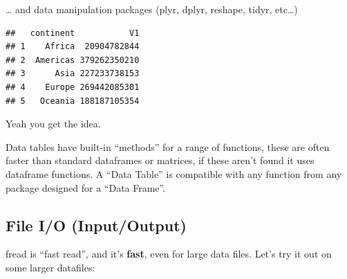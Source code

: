\documentclass[]{article}
\newenvironment{Shaded}{\begin{snugshade}}{\end{snugshade}}
\newcommand{\KeywordTok}[1]{\textcolor[rgb]{0.13,0.29,0.53}{\textbf{{#1}}}}
\newcommand{\DataTypeTok}[1]{\textcolor[rgb]{0.13,0.29,0.53}{{#1}}}
\newcommand{\StringTok}[1]{\textcolor[rgb]{0.31,0.60,0.02}{{#1}}}
\newcommand{\OtherTok}[1]{\textcolor[rgb]{0.56,0.35,0.01}{{#1}}}
\newcommand{\NormalTok}[1]{{#1}}
\begin{document}
\ldots{} and data manipulation packages (plyr, dplyr, reshape, tidyr,
etc\ldots{})

\begin{Shaded}
\end{Shaded}

\begin{verbatim}
##   continent           V1
## 1    Africa  20904782844
## 2  Americas 379262350210
## 3      Asia 227233738153
## 4    Europe 269442085301
## 5   Oceania 188187105354
\end{verbatim}

Yeah you get the idea.

Data tables have built-in ``methods'' for a range of functions, these
are often faster than standard dataframes or matrices, if these aren't
found it uses dataframe functions. A ``Data Table'' is compatible with
any function from any package designed for a ``Data Frame''.

\subsection{File I/O (Input/Output)}\label{file-io-inputoutput}

fread is ``fast read'', and it's \textbf{fast}, even for large data
files. Let's try it out on some larger datafiles:
\end{document}
